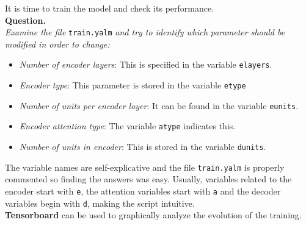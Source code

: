 \documentclass[a4paper]{article}
\def\inline{\lstinline[basicstyle=\ttfamily,keywordstyle={}]}
\begin{document}
It is time to train the model and check its performance.\\

\textbf{Question.}\\

\emph{Examine the file} \inline{train.yalm} \emph{and try to identify which parameter should be modified in order to change:}
\begin{itemize}
  \item \emph{Number of encoder layers}: This is specified in the variable \inline{elayers}.
  \item \emph{Encoder type}: This parameter is stored in the variable \inline{etype}
  \item \emph{Number of units per encoder layer}: It can be found in the variable \inline{eunits}.
  \item \emph{Encoder attention type}: The variable \inline{atype} indicates this.
  \item \emph{Number of units in encoder}: This is stored in the variable \inline{dunits}.

\end{itemize}
The variable names are self-explicative and the file \inline{train.yalm} is properly commented so finding the answers was easy. Usually, variables related to the encoder start with \inline{e}, the attention variables start with \inline{a} and the decoder variables begin with \inline{d}, making the script intuitive.\\

\textbf{Tensorboard} can be used to graphically analyze the evolution of the training.\\
\end{document}
